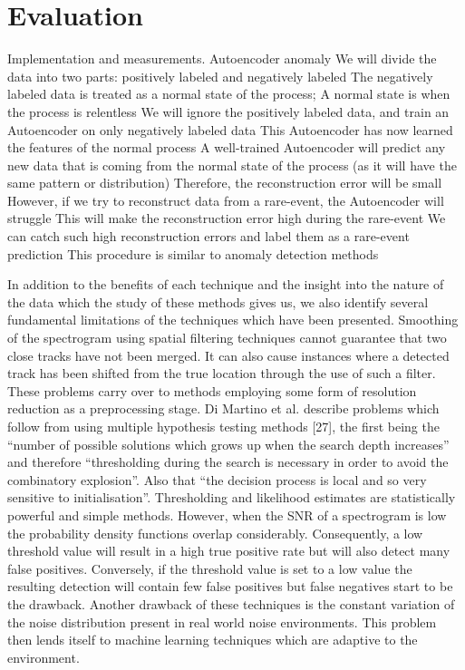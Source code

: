 

    \chapter{Evaluation}

    Implementation and measurements.
    Autoencoder anomaly
    We will divide the data into two parts: positively labeled and negatively labeled
    The negatively labeled data is treated as a normal state of the process; A normal state is when the process is relentless
    We will ignore the positively labeled data, and train an Autoencoder on only negatively labeled data
    This Autoencoder has now learned the features of the normal process
    A well-trained Autoencoder will predict any new data that is coming from the normal state of the process (as it will have the same pattern or distribution)
    Therefore, the reconstruction error will be small
    However, if we try to reconstruct data from a rare-event, the Autoencoder will struggle
    This will make the reconstruction error high during the rare-event
    We can catch such high reconstruction errors and label them as a rare-event prediction
    This procedure is similar to anomaly detection methods
    
    
    
    In addition to the benefits of each technique and the insight into the
    nature of the data which the study of these methods gives us, we also identify
    several fundamental limitations of the techniques which have been presented.
    Smoothing of the spectrogram using spatial filtering techniques cannot
    guarantee that two close tracks have not been merged. It can also cause
    instances where a detected track has been shifted from the true location
    through the use of such a filter. These problems carry over to methods
    employing some form of resolution reduction as a preprocessing stage.
    Di Martino et al. describe problems which follow from using multiple
    hypothesis testing methods [27], the first being the “number of possible
    solutions which grows up when the search depth increases” and therefore
    “thresholding during the search is necessary in order to avoid the combinatory explosion”. Also that “the decision process is local and so very sensitive
    to initialisation”.
    Thresholding and likelihood estimates are statistically powerful and simple methods. However, when the SNR of a spectrogram is low the probability
    density functions overlap considerably. Consequently, a low threshold value
    will result in a high true positive rate but will also detect many false positives. Conversely, if the threshold value is set to a low value the resulting
    detection will contain few false positives but false negatives start to be the drawback. Another drawback of these techniques is the constant variation of
    the noise distribution present in real world noise environments. This problem
    then lends itself to machine learning techniques which are adaptive to the
    environment.


